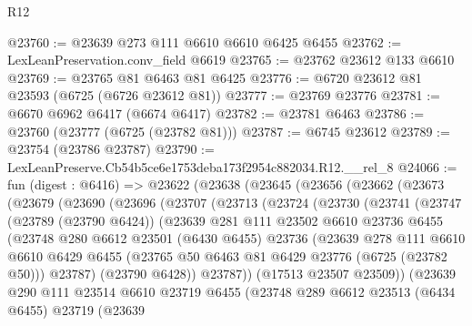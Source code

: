 \begin{lexlean}{R12}
\begin{coremodule}
@23760 := @23639 @273 @111 @6610 @6610 @6425 @6455
@23762 := LexLeanPreservation.conv_field @6619
@23765 := @23762 @23612 @133 @6610
@23769 := @23765 @81 @6463 @81 @6425
@23776 := @6720 @23612 @81 @23593 (@6725 (@6726 @23612 @81))
@23777 := @23769 @23776
@23781 := @6670 @6962 @6417 (@6674 @6417)
@23782 := @23781 @6463
@23786 := @23760 (@23777 (@6725 (@23782 @81)))
@23787 := @6745 @23612
@23789 := @23754 (@23786 @23787)
@23790 := LexLeanPreserve.Cb54b5ce6e1753deba173f2954c882034.R12.__rel_8
@24066 := fun (digest : @6416) =>
  @23622
    (@23638
      (@23645
        (@23656
          (@23662
            (@23673
              (@23679
                (@23690
                  (@23696
                    (@23707
                      (@23713
                        (@23724
                          (@23730
                            (@23741
                              (@23747
                                (@23789 (@23790 @6424))
                                (@23639
                                  @281
                                  @111
                                  @23502
                                  @6610
                                  @23736
                                  @6455
                                  (@23748
                                    @280
                                    @6612
                                    @23501
                                    (@6430 @6455)
                                    @23736
                                    (@23639
                                      @278
                                      @111
                                      @6610
                                      @6610
                                      @6429
                                      @6455
                                      (@23765 @50 @6463 @81 @6429 @23776 (@6725 (@23782 @50)))
                                      @23787)
                                    (@23790 @6428))
                                  @23787))
                              (@17513 @23507 @23509))
                            (@23639
                              @290
                              @111
                              @23514
                              @6610
                              @23719
                              @6455
                              (@23748
                                @289
                                @6612
                                @23513
                                (@6434 @6455)
                                @23719
                                (@23639

\end{coremodule}
\end{lexlean}
